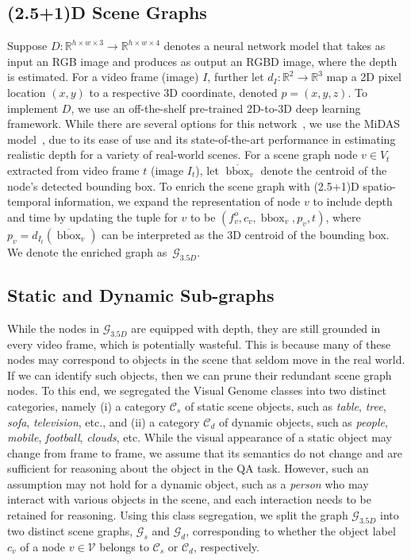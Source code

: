 \documentclass[letterpaper]{article} \usepackage{aaai22}  \usepackage{times}  \usepackage{helvet}  \usepackage{courier}  \usepackage[hyphens]{url}  \usepackage{graphicx} \urlstyle{rm} \def\UrlFont{\rm}  \usepackage{natbib}  \usepackage{caption} \DeclareCaptionStyle{ruled}{labelfont=normalfont,labelsep=colon,strut=off} \frenchspacing  \setlength{\pdfpagewidth}{8.5in}  \setlength{\pdfpageheight}{11in}  \usepackage{algorithm}
\newcommand{\fo}{f^o}
\newcommand{\depth}{D}
\newcommand{\graph}{\mathcal{G}}
\newcommand{\gtf}{\graph_{3.5D}}
\newcommand{\class}{\mathcal{C}}
\newcommand{\name}{(2.5+1)D\xspace}
\newcommand{\vset}{\mathcal{V}}
\newcommand{\nodes}{V}
\newcommand{\node}{v}
\newcommand{\reals}[1]{\mathbb{R}^{#1}}
\DeclareMathOperator{\bbox}{bbox}
\begin{document}
\subsection{\name Scene Graphs}
Suppose $\depth\!:\reals{h\times w\times 3}\to\reals{h\times w\times 4}$ denotes a neural network model that takes as input an RGB image and produces as output an RGBD image, where the depth is estimated. For a video frame (image) $I$, further let $d_{I}:\reals{2}\to\reals{3}$ map a 2D pixel location $(x, y)$ to a respective 3D coordinate, denoted $p=(x,y,z)$. To implement $\depth$, we use an off-the-shelf pre-trained 2D-to-3D deep learning framework. While there are several options for this network~\cite{fu2018deep,li2020unsupervised}, we use the MiDAS model~\cite{ranftl2019towards}, due to its ease of use and its state-of-the-art performance in estimating realistic depth for a variety of real-world scenes. 
For a scene graph node $\node \in \nodes_t$ extracted from video frame $t$ (image $I_t$), let $\overline{\bbox}_\node$ denote the centroid of the node's detected bounding box. To enrich the scene graph with \name spatio-temporal information, we expand the representation of node $\node$ to include depth and time by updating the tuple for $\node$ to be $(\fo_\node, c_\node, \bbox_\node, p_\node, t)$, where $p_\node = d_{I_t}(\overline{\bbox}_\node)$ can be interpreted as the 3D centroid of the bounding box.
We denote the enriched graph as~$\graph_{3.5D}$.

\subsection{Static and Dynamic Sub-graphs}
While the nodes in $\gtf$ are equipped with depth, they are still grounded in every video frame, which is potentially wasteful. This is because many of these nodes may correspond to objects in the scene that seldom move in the real world. If we can identify such objects, then we can prune their redundant scene graph nodes. To this end, we segregated the Visual Genome classes into two distinct categories,  namely (i) a category $\class_s$ of static scene objects, such as \emph{table}, \emph{tree}, \emph{sofa}, \emph{television}, etc., and (ii) a category $\class_d$ of dynamic objects, such as \emph{people}, \emph{mobile}, \emph{football}, \emph{clouds}, etc. While the visual appearance of a static object may change from frame to frame, we assume that its semantics do not change and are sufficient for reasoning about the object in the QA task. However, such an assumption may not hold for a dynamic object, such as a \emph{person} who may interact with various objects in the scene, and each interaction needs to be retained for reasoning. Using this class segregation, we split the graph $\gtf$ into two distinct scene graphs, $\graph_s$ and $\graph_d$, corresponding to whether the object label $c_\node$ of a node $\node\in\vset$ belongs to $\class_s$ or $\class_d$, respectively. 
\end{document}
